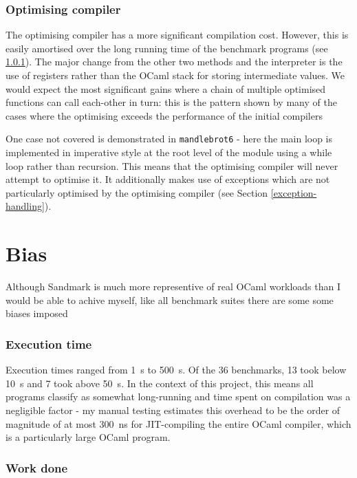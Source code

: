 \subsubsection{Optimising compiler}

The optimising compiler has a more significant compilation cost. However, this is easily amortised
over the long running time of the benchmark programs (see \ref{bias-exec-time}). The major change
from the other two methods and the interpreter is the use of registers rather than the OCaml stack
for storing intermediate values. We would expect the most significant gains where a chain of
multiple
optimised functions can call each-other in turn: this is the pattern shown by many of the cases
where the optimising exceeds the performance of the initial compilers

One case not covered is demonstrated in \texttt{mandlebrot6} - here the main loop is implemented in
imperative style at the root level of the module using a while loop rather than recursion. This
means that the optimising compiler will never attempt to optimise it. It additionally makes use of
exceptions which are not particularly optimised by the optimising compiler (see Section
\ref{exception-handling}).

\section{Bias}

Although Sandmark is much more representive of real OCaml workloads than I would be able to achive
myself,
like all benchmark suites there are some some biases imposed

\subsubsection{Execution time} \label{bias-exec-time}

Execution times ranged from \SI{1}{\second} to \SI{500}{\second}. Of the 36 benchmarks, 13 took
below \SI{10}{\second} and 7 took above \SI{50}{\second}.  In the context of this project, this
means all programs classify as somewhat long-running and time spent on compilation was a negligible
factor - my manual testing estimates this overhead to be the order of magnitude of at most
\SI{300}{\nano\second} for JIT-compiling the entire OCaml compiler, which is a particularly large
OCaml program.

\subsubsection{Work done}


